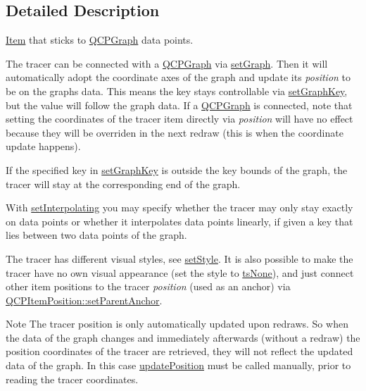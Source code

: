 \subsection{Detailed Description}
\hyperlink{class_item}{Item} that sticks to \hyperlink{class_q_c_p_graph}{Q\+C\+P\+Graph} data points. 

 The tracer can be connected with a \hyperlink{class_q_c_p_graph}{Q\+C\+P\+Graph} via \hyperlink{class_q_c_p_item_tracer_af5886f4ded8dd68cb4f3388f390790c0}{set\+Graph}. Then it will automatically adopt the coordinate axes of the graph and update its {\itshape position} to be on the graph\textquotesingle{}s data. This means the key stays controllable via \hyperlink{class_q_c_p_item_tracer_a6840143b42f3b685cedf7c6d83a704c8}{set\+Graph\+Key}, but the value will follow the graph data. If a \hyperlink{class_q_c_p_graph}{Q\+C\+P\+Graph} is connected, note that setting the coordinates of the tracer item directly via {\itshape position} will have no effect because they will be overriden in the next redraw (this is when the coordinate update happens).

If the specified key in \hyperlink{class_q_c_p_item_tracer_a6840143b42f3b685cedf7c6d83a704c8}{set\+Graph\+Key} is outside the key bounds of the graph, the tracer will stay at the corresponding end of the graph.

With \hyperlink{class_q_c_p_item_tracer_a6c244a9d1175bef12b50afafd4f5fcd2}{set\+Interpolating} you may specify whether the tracer may only stay exactly on data points or whether it interpolates data points linearly, if given a key that lies between two data points of the graph.

The tracer has different visual styles, see \hyperlink{class_q_c_p_item_tracer_a41a2ac4f1acd7897b4e2a2579c03204e}{set\+Style}. It is also possible to make the tracer have no own visual appearance (set the style to \hyperlink{class_q_c_p_item_tracer_a2f05ddb13978036f902ca3ab47076500af543193a0b17ac133beb26152292f6b6}{ts\+None}), and just connect other item positions to the tracer {\itshape position} (used as an anchor) via \hyperlink{class_q_c_p_item_position_ac094d67a95d2dceafa0d50b9db3a7e51}{Q\+C\+P\+Item\+Position\+::set\+Parent\+Anchor}.

\begin{DoxyNote}{Note}
The tracer position is only automatically updated upon redraws. So when the data of the graph changes and immediately afterwards (without a redraw) the position coordinates of the tracer are retrieved, they will not reflect the updated data of the graph. In this case \hyperlink{class_q_c_p_item_tracer_a5b90296109e36384aedbc8908a670413}{update\+Position} must be called manually, prior to reading the tracer coordinates. 
\end{DoxyNote}


